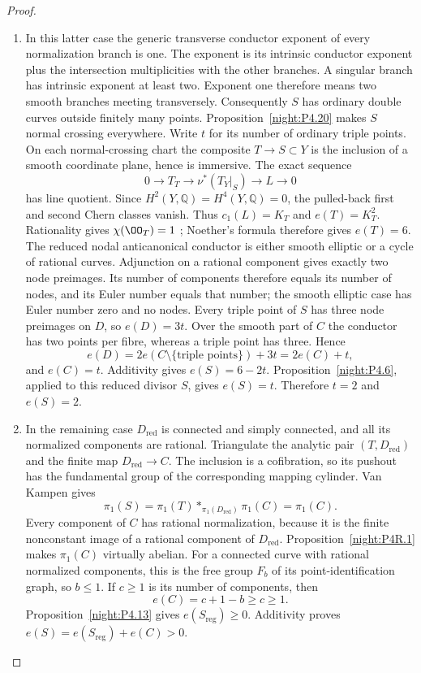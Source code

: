 \begin{proof}
\begin{enumerate}[label={$\langle1\rangle$\arabic*.},leftmargin=*]
\item In this latter case the generic transverse conductor
exponent of every normalization branch is one. The
exponent is its intrinsic conductor exponent plus the
intersection multiplicities with the other branches.
A singular branch has intrinsic exponent at least two.
Exponent one therefore means two smooth branches
meeting transversely. Consequently $S$ has ordinary double curves outside finitely
many points. Proposition~\ref{night:P4.20} makes $S$ normal crossing
everywhere. Write $t$ for its number of ordinary triple points.
On each normal-crossing chart the composite $T\to S\subset Y$
is the inclusion of a smooth coordinate plane, hence is immersive.
The exact sequence
\[
0\longrightarrow T_T\longrightarrow\nu^*(T_Y|_S)
 \longrightarrow L\longrightarrow0
\]
has line quotient. Since $H^2(Y,\mathbb Q)=H^4(Y,\mathbb Q)=0$,
the pulled-back first and second Chern classes vanish. Thus
$c_1(L)=K_T$ and $e(T)=K_T^2$. Rationality gives
$\chi(\OO_T)=1$ \cite[III.20--21, pp.~48--50]{Beauville1978};
Noether's formula therefore gives $e(T)=6$.
The reduced nodal anticanonical conductor is either smooth elliptic
or a cycle of rational curves. Adjunction on a rational component
gives exactly two node preimages. Its number of components therefore
equals its number of nodes, and its Euler number equals that number;
the smooth elliptic case has Euler number zero and no nodes. Every triple point
of $S$ has three node preimages on $D$, so $e(D)=3t$.
Over the smooth part of $C$ the conductor has two points per fibre,
whereas a triple point has three. Hence
\[
e(D)=2e(C\setminus\{\text{triple points}\})+3t
     =2e(C)+t,
\]
and $e(C)=t$. Additivity gives $e(S)=6-2t$.
Proposition~\ref{night:P4.6}, applied to this reduced divisor $S$,
gives $e(S)=t$. Therefore $t=2$ and $e(S)=2$.

\item In the remaining case $D_{\mathrm{red}}$ is connected
and simply connected, and all its normalized components
are rational. Triangulate the analytic pair $(T,D_{\mathrm{red}})$ and the finite
map $D_{\mathrm{red}}\to C$. The inclusion is a cofibration, so
its pushout has the fundamental group of the corresponding mapping
cylinder. Van Kampen gives
\[
 \pi_1(S)=\pi_1(T)*_{\pi_1(D_{\mathrm{red}})}\pi_1(C)
          =\pi_1(C).
\]
Every component of $C$ has rational normalization,
because it is the finite nonconstant image of a
rational component of $D_{\mathrm{red}}$. Proposition~\ref{night:P4R.1} makes
$\pi_1(C)$ virtually abelian. For a connected curve
with rational normalized components, this is the free
group $F_b$ of its point-identification graph, so
$b\le1$. If $c\ge1$ is its number of components, then
\[
 e(C)=c+1-b\ge c\ge1.
\]
Proposition~\ref{night:P4.13} gives $e(S_{\mathrm{reg}})\ge0$. Additivity proves
$e(S)=e(S_{\mathrm{reg}})+e(C)>0$.

\end{enumerate}
\end{proof}